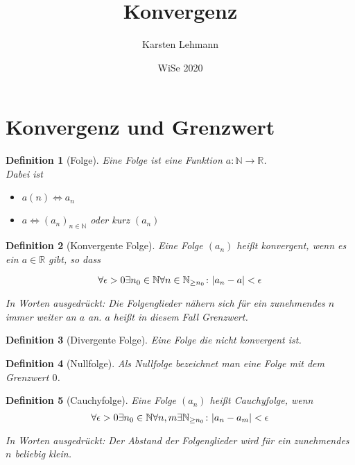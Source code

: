 \documentclass{article}
\author{Karsten Lehmann}
\date{WiSe 2020}
\title{Konvergenz}
\newtheorem*{definition}{Definition}
\begin{document}
\section*{Konvergenz und Grenzwert}

\begin{definition}[Folge]
  Eine Folge ist eine Funktion $a \colon \mathbb{N} \to \mathbb{R}$. \\
  Dabei ist
  \begin{itemize}
  \item $a(n) \iff a_n$
  \item $a \iff \left(a_n\right)_{n\in\mathbb{N}}$ oder kurz $\left(a_n\right)$
  \end{itemize}
\end{definition}

\begin{definition}[Konvergente Folge]
  Eine Folge $\left(a_n\right)$ heißt konvergent, wenn es ein $a \in \mathbb{R}$ gibt, so dass

  \[
    \forall \epsilon > 0 \exists n_0 \in \mathbb{N} \forall n \in \mathbb{N}_{\geq n_0} \colon \abs{a_n - a} < \epsilon
  \]

  In Worten ausgedrückt: Die Folgenglieder nähern sich für ein zunehmendes $n$ immer weiter an $a$ an.
  $a$ heißt in diesem Fall Grenzwert.

  \begin{tikzpicture}

  \end{tikzpicture}
\end{definition}

\begin{definition}[Divergente Folge]
  Eine Folge die nicht konvergent ist.
\end{definition}

\begin{definition}[Nullfolge]
  Als Nullfolge bezeichnet man eine Folge mit dem Grenzwert $0$.
\end{definition}

\begin{definition}[Cauchyfolge]
  Eine Folge $\left(a_n\right)$ heißt Cauchyfolge, wenn
  \[
    \forall \epsilon > 0 \exists n_0 \in \mathbb{N} \forall n, m \exists \mathbb{N}_{\geq n_0} \colon \abs{a_n - a_m} < \epsilon
  \]

  In Worten ausgedrückt: Der Abstand der Folgenglieder wird für ein zunehmendes $n$ beliebig klein.
\end{definition}
\end{document}
